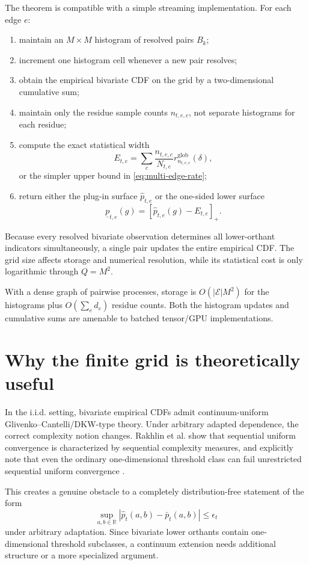 \documentclass[11pt]{article}
\newcommand{\cE}{\mathcal{E}}
\newcommand{\1}{\mathbf{1}}
\newcommand{\R}{\mathbb{R}}
\begin{document}
The theorem is compatible with a simple streaming implementation.
For each edge $e$:
\begin{enumerate}[leftmargin=*]
    \item maintain an $M\times M$ histogram of resolved pairs $B_k$;
    \item increment one histogram cell whenever a new pair resolves;
    \item obtain the empirical bivariate CDF on the grid by a two-dimensional
    cumulative sum;
    \item maintain only the residue sample counts $n_{t,e,c}$, not separate
    histograms for each residue;
    \item compute the exact statistical width
    \[
        E_{t,e}
        =
        \sum_c
        \frac{n_{t,e,c}}{N_{t,e}}
        r_{n_{t,e,c}}^{\mathrm{glob}}(\delta),
    \]
    or the simpler upper bound in \eqref{eq:multi-edge-rate};
    \item return either the plug-in surface $\widehat p_{t,e}$ or the one-sided
    lower surface
    \[
        \underline p_{t,e}(g)
        =
        [\widehat p_{t,e}(g)-E_{t,e}]_+.
    \]
\end{enumerate}

Because every resolved bivariate observation determines all lower-orthant
indicators simultaneously, a single pair updates the entire empirical CDF.
The grid size affects storage and numerical resolution, while its statistical
cost is only logarithmic through $Q=M^2$.

With a dense graph of pairwise processes, storage is
$O(|\cE|M^2)$ for the histograms plus $O(\sum_e d_e)$ residue counts.  Both the
histogram updates and cumulative sums are amenable to batched tensor/GPU
implementations.

\section{Why the finite grid is theoretically useful}

In the i.i.d. setting, bivariate empirical CDFs admit continuum-uniform
Glivenko--Cantelli/DKW-type theory.  Under arbitrary adapted dependence, the
correct complexity notion changes.  Rakhlin et al. show that sequential
uniform convergence is characterized by sequential complexity measures, and
explicitly note that even the ordinary one-dimensional threshold class can
fail unrestricted sequential uniform convergence \cite{rakhlin2015}.

This creates a genuine obstacle to a completely distribution-free statement
of the form
\[
    \sup_{a,b\in\R}
    \left|
        \widehat p_t(a,b)-\bar p_t(a,b)
    \right|
    \le \epsilon_t
\]
under arbitrary adaptation.  Since bivariate lower orthants contain
one-dimensional threshold subclasses, a continuum extension needs additional
structure or a more specialized argument.
\end{document}
